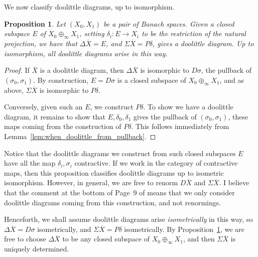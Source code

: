 \documentclass[a4paper,11pt]{article}
\theoremstyle{plain}
\newtheorem{proposition}{Proposition}[section]
\theoremstyle{remark}
\begin{document}
We now classify doolittle diagrams, up to isomorphism.

\begin{proposition}\label{prop:classification_doolittle}
Let $(X_0, X_1)$ be a pair of Banach spaces.  Given a closed subspace $E$ of $X_0 \oplus_\infty X_1$, setting $\delta_i \colon E \to X_i$ to be the restriction of the natural projection, we have that $\Delta\overline X = E$, and $\Sigma\overline X = P\delta$, gives a doolittle diagram.  Up to isomorphism, all doolittle diagrams arise in this way.
\end{proposition}
\begin{proof}
If $\overline X$ is a doolittle diagram, then $\Delta\overline X$ is isomorphic to $D\sigma$, the pullback of $(\sigma_0, \sigma_1)$.  By construction, $E = D\sigma$ is a closed subspace of $X_0 \oplus_\infty X_1$, and as above, $\Sigma\overline X$ is isomorphic to $P\delta$.

Conversely, given such an $E$, we construct $P\delta$.  To show we have a doolittle diagram, it remains to show that $E, \delta_0, \delta_1$ gives the pullback of $(\sigma_0, \sigma_1)$, these maps coming from the construction of $P\delta$.
This follows immediately from Lemma~\ref{lem:when_doolittle_from_pullback}.
\end{proof}

Notice that the doolittle diagrams we construct from such closed subspaces $E$ have all the map $\delta_i, \sigma_i$ contractive.
If we work in the category of contractive maps, then this proposition classifies doolittle diagrams up to isometric isomorphism.  However, in general, we are free to renorm $D\overline X$ and $\Sigma\overline X$.  I believe that the comment at the bottom of Page~9 of \cite{KP_InterpolationFunctorsDuality} means that we only consider doolittle diagrams coming from this construction, and not renormings.

Henceforth, we shall assume doolittle diagrams arise \emph{isometrically} in this way, so $\Delta\overline X = D\sigma$ isometrically, and $\Sigma\overline X = P\delta$ isometrically.  By Proposition~\ref{prop:classification_doolittle}, we are free to choose $\Delta\overline X$ to be any closed subspace of $X_0\oplus_\infty X_1$, and then $\Sigma\overline X$ is uniquely determined.
\end{document}

